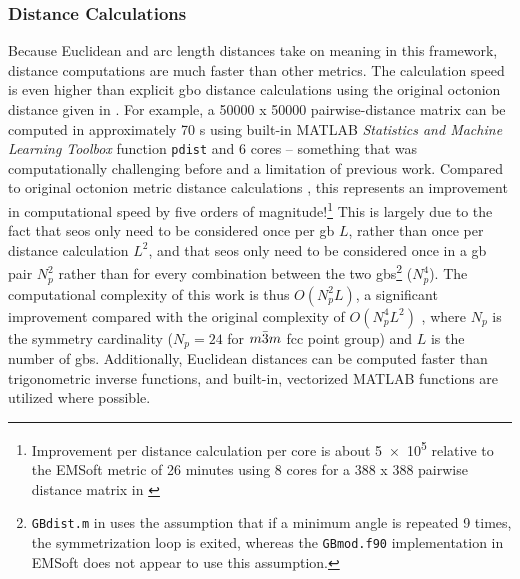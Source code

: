 \documentclass[preprint,12pt]{elsarticle}
\begin{document}
\subsubsection{Distance Calculations}
Because Euclidean and arc length distances take on meaning in this framework, distance computations are much faster than other metrics. The calculation speed is even higher than explicit \gls{gbo} distance calculations using the original octonion distance given in \cite{francisGeodesicOctonionMetric2019}. For example, a \num{50000} x \num{50000} pairwise-distance matrix can be computed in approximately 70 s using built-in MATLAB \textit{Statistics and Machine Learning Toolbox} function \texttt{pdist} and 6 cores -- something that was computationally challenging before and a limitation of previous work. Compared to original octonion metric distance calculations \cite{chesserLearningGrainBoundary2020}, this represents an improvement in computational speed by five orders of magnitude!\footnote{Improvement per distance calculation per core is about \num{5e5} relative to the EMSoft \cite{degraefEMSoft2020} metric of 26 minutes using 8 cores for a 388 x 388 pairwise distance matrix in \cite{chesserLearningGrainBoundary2020}} This is largely due to the fact that \glspl{seo} only need to be considered once per \gls{gb} $L$, rather than once per distance calculation $L^2$,
and that \glspl{seo} only need to be considered once in a \gls{gb} pair $N_p^2$ rather than for every combination between the two \glspl{gb}\footnote{\texttt{GBdist.m} in \cite{chesserGBOctonionCode2019} uses the assumption that if a minimum angle is repeated 9 times, the symmetrization loop is exited, whereas the \texttt{GBmod.f90} implementation in EMSoft \cite{degraefEMSoft2020} does not appear to use this assumption.} ($N_p^4$). The computational complexity of this work is thus $O(N_p^2L)$, a significant improvement compared with the original complexity of $O(N_p^4L^2)$ \cite{chesserLearningGrainBoundary2020}, where $N_p$ is the symmetry cardinality ($N_p=24$ for $m\Bar{3}m$ \gls{fcc} point group) and $L$ is the number of \glspl{gb}. Additionally, Euclidean distances can be computed faster than trigonometric inverse functions, and built-in, vectorized MATLAB functions are utilized where possible. %
\end{document}
